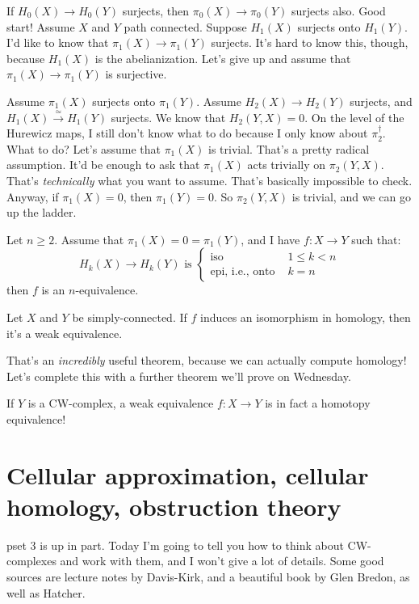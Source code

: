 If $H_0(X)\to H_0(Y)$ surjects, then $\pi_0(X)\to \pi_0(Y)$ surjects also. Good start! Assume $X$ and $Y$ path connected. Suppose $H_1(X)$ surjects onto $H_1(Y)$. I'd like to know that $\pi_1(X)\to\pi_1(Y)$ surjects. It's hard to know this, though, because $H_1(X)$ is the abelianization. Let's give up and assume that $\pi_1(X)\to \pi_1(Y)$ is surjective.

Assume $\pi_1(X)$ surjects onto $\pi_1(Y)$. Assume $H_2(X)\to H_2(Y)$ surjects, and $H_1(X)\xrightarrow{\simeq}H_1(Y)$ surjects. We know that $H_2(Y,X) = 0$. On the level of the Hurewicz maps, I still don't know what to do because I only know about $\pi_2^\dagger$. What to do? Let's assume that $\pi_1(X)$ is trivial. That's a pretty radical assumption. It'd be enough to ask that $\pi_1(X)$ acts trivially on $\pi_2(Y,X)$. That's \emph{technically} what you want to assume. That's basically impossible to check. Anyway, if $\pi_1(X) = 0$, then $\pi_1(Y) = 0$. So $\pi_2(Y,X)$ is trivial, and we can go up the ladder.
\begin{theorem}[J.~H.~C.~Whitehead 2]
    Let $n\geq 2$. Assume that $\pi_1(X) = 0 = \pi_1(Y)$, and I have $f:X\to Y$ such that:
\begin{equation*}
H_k(X)\to H_k(Y) \text{ is }\begin{cases}
\text{iso } & 1\leq k<n\\
\text{epi, i.e., onto } & k = n
\end{cases}
\end{equation*}
then $f$ is an $n$-equivalence.
\end{theorem}
\begin{corollary}
    Let $X$ and $Y$ be simply-connected. If $f$ induces an isomorphism in homology, then it's a weak equivalence.
\end{corollary}
That's an \emph{incredibly} useful theorem, because we can actually compute homology! Let's complete this with a further theorem we'll prove on Wednesday.
\begin{theorem}
    If $Y$ is a CW-complex, a weak equivalence $f:X\to Y$ is in fact a homotopy equivalence!
\end{theorem}
\section{Cellular approximation, cellular homology, obstruction theory}
pset 3 is up in part. Today I'm going to tell you how to think about CW-complexes and work with them, and I won't give a lot of details. Some good sources are lecture notes by Davis-Kirk, and a beautiful book by Glen Bredon, as well as Hatcher.
